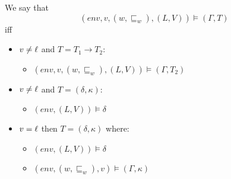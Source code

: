 \documentclass{llncs}
\newcommand{\sqleq}{\ensuremath{\sqsubseteq\xspace}}
\begin{document}
\begin{definition}\label{def:TAgree}
	We say that
	$$(env,v,(w,\sqleq_w),(L,V))\models(\Gamma,T)$$
	iff
	\begin{itemize}
		\item $v\neq\ell$ and $T=T_1\rightarrow T_2$:
		\begin{itemize}
			\item $(env,v,(w,\sqleq_w),(L,V))\models(\Gamma,T_2)$
		\end{itemize}

		\item $v\neq\ell$ and $T=(\delta,\kappa)$:
		\begin{itemize}
			\item $(env,(L,V))\models\delta$
		\end{itemize}

		\item $v=\ell$ then $T=(\delta,\kappa)$ where:
		\begin{itemize}
			\item $(env,(L,V))\models\delta$
			\item $(env,(w,\sqleq_w),v)\models(\Gamma,\kappa)$
		\end{itemize}
	\end{itemize}
\end{definition}

\end{document}
